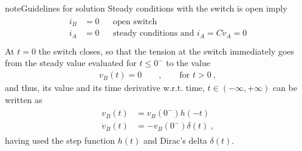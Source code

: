 \documentclass[letterpaper,10pt,italian]{jupyterBook}
\begin{document}
\begin{sphinxadmonition}{note}{Guidelines for solution}
\sphinxAtStartPar
{} Steady conditions with the switch is open imply
\begin{equation*}
\begin{split}\begin{aligned}
       i_B & = 0 && \text{open switch} \\
       i_A & = 0 && \text{steady conditions and $i_A = C \dot{v}_A = 0$} \\
   \end{aligned}\end{split}
\end{equation*}
\sphinxAtStartPar
{} At \(t = 0\) the switch closes, so that the tension at the switch immediately goes from the steady value evaluated for \(t \le 0^-\) to the value
\begin{equation*}
\begin{split}v_B(t) = 0 \qquad , \qquad \text{for $t > 0$} \ ,\end{split}
\end{equation*}
\sphinxAtStartPar
and thus, its value and its time derivative w.r.t. time, \(t \in (-\infty, +\infty)\) can be written as
\begin{equation*}
\begin{split}\begin{aligned}
        v_B  (t) & = v_B(0^-) h(-t) \\
    \dot{v}_B(t) & = - v_B(0^-) \delta(t) \ ,
  \end{aligned}\end{split}
\end{equation*}
\sphinxAtStartPar
having used the step function \(h(t)\) and Dirac’s delta \(\delta(t)\).


\end{sphinxadmonition}
\end{document}

